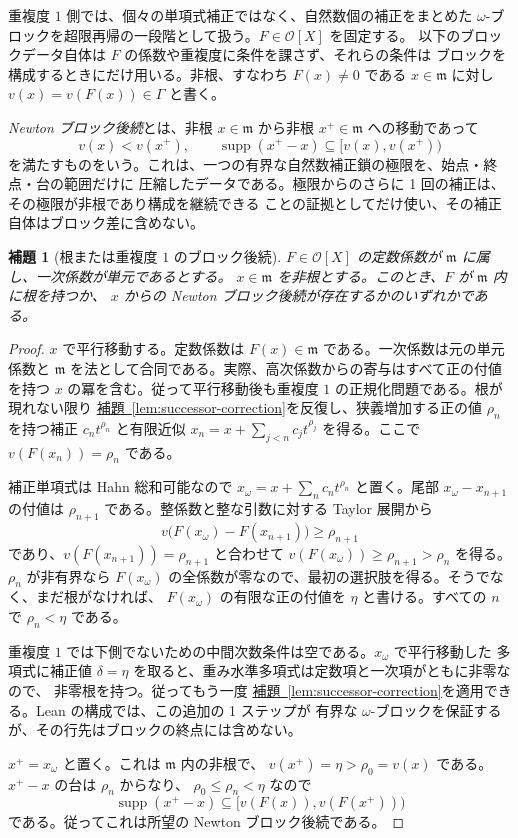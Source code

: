 \documentclass[11pt,uplatex,dvipdfmx]{jsarticle}
\newcommand{\Val}{v}
\newcommand{\Supp}{\operatorname{supp}}
\newcommand{\Ocal}{\mathcal O}
\newcommand{\namedref}[2]{\hyperref[#2]{#1~\ref*{#2}}}
\theoremstyle{proofnote}
\newtheorem{lemma}[theorem]{補題}
\begin{document}
重複度 \(1\) 側では、個々の単項式補正ではなく、自然数個の補正をまとめた
\(\omega\)-ブロックを超限再帰の一段階として扱う。\(F\in\Ocal[X]\) を固定する。
以下のブロックデータ自体は \(F\) の係数や重複度に条件を課さず、それらの条件は
ブロックを構成するときにだけ用いる。非根、すなわち \(F(x)\ne0\) である
\(x\in\mathfrak m\) に対し
\(v(x)=\Val(F(x))\in\Gamma\) と書く。

\emph{Newton ブロック後続}とは、非根 \(x\in\mathfrak m\) から非根
\(x^+\in\mathfrak m\) への移動であって
  \[
    v(x)<v(x^+),\qquad
    \Supp(x^+-x)\subseteq [v(x),v(x^+))
  \]
を満たすものをいう。これは、一つの有界な自然数補正鎖の極限を、始点・終点・台の範囲だけに
圧縮したデータである。極限からのさらに 1 回の補正は、その極限が非根であり構成を継続できる
ことの証拠としてだけ使い、その補正自体はブロック差に含めない。

\begin{lemma}[根または重複度 \(1\) のブロック後続]
\label{lem:one-block-successor}
  \(F\in\Ocal[X]\) の定数係数が \(\mathfrak m\) に属し、一次係数が単元であるとする。
  \(x\in\mathfrak m\) を非根とする。このとき、\(F\) が \(\mathfrak m\) 内に根を持つか、
  \(x\) からの Newton ブロック後続が存在するかのいずれかである。
\end{lemma}
\begin{proof}
  \(x\) で平行移動する。定数係数は \(F(x)\in\mathfrak m\) である。一次係数は元の単元係数と
  \(\mathfrak m\) を法として合同である。実際、高次係数からの寄与はすべて正の付値を持つ
  \(x\) の冪を含む。従って平行移動後も重複度 \(1\) の正規化問題である。根が現れない限り
  \namedref{補題}{lem:successor-correction}を反復し、狭義増加する正の値 \(\rho_n\) を持つ補正
  \(c_nt^{\rho_n}\) と有限近似
  \(x_n=x+\sum_{j<n}c_jt^{\rho_j}\) を得る。ここで
  \(\Val(F(x_n))=\rho_n\) である。

  補正単項式は Hahn 総和可能なので
  \(x_\omega=x+\sum_nc_nt^{\rho_n}\) と置く。尾部
  \(x_\omega-x_{n+1}\) の付値は \(\rho_{n+1}\) である。整係数と整な引数に対する Taylor 展開から
  \[
    \Val\bigl(F(x_\omega)-F(x_{n+1})\bigr)\ge\rho_{n+1}
  \]
  であり、\(\Val(F(x_{n+1}))=\rho_{n+1}\) と合わせて
  \(\Val(F(x_\omega))\ge\rho_{n+1}>\rho_n\) を得る。\(\rho_n\) が非有界なら
  \(F(x_\omega)\) の全係数が零なので、最初の選択肢を得る。そうでなく、まだ根がなければ、
  \(F(x_\omega)\) の有限な正の付値を \(\eta\) と書ける。すべての \(n\) で
  \(\rho_n<\eta\) である。

  重複度 \(1\) では下側でないための中間次数条件は空である。\(x_\omega\) で平行移動した
  多項式に補正値 \(\delta=\eta\) を取ると、重み水準多項式は定数項と一次項がともに非零なので、
  非零根を持つ。従ってもう一度
  \namedref{補題}{lem:successor-correction}を適用できる。Lean の構成では、この追加の 1 ステップが
  有界な \(\omega\)-ブロックを保証するが、その行先はブロックの終点には含めない。

  \(x^+=x_\omega\) と置く。これは \(\mathfrak m\) 内の非根で、
  \(v(x^+)=\eta>\rho_0=v(x)\) である。\(x^+-x\) の台は \(\rho_n\) からなり、
  \(\rho_0\le\rho_n<\eta\) なので
  \[
    \Supp(x^+-x)\subseteq[\Val(F(x)),\Val(F(x^+)))
  \]
  である。従ってこれは所望の Newton ブロック後続である。
\end{proof}
\end{document}
